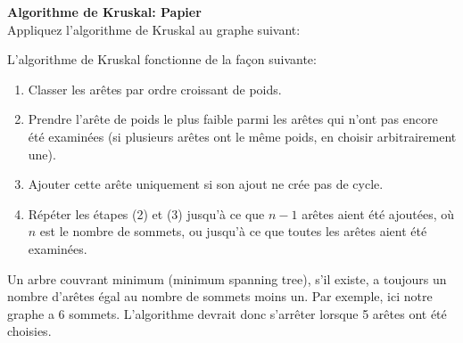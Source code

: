 \begin{Exercice}[5 minutes] \textbf{Algorithme de Kruskal\!: Papier}\\
    Appliquez l'algorithme de Kruskal au graphe suivant\!:\\
    \begin{center}
\end{center}
    \begin{conseil}
        L'algorithme de Kruskal fonctionne de la façon suivante\!:
        \begin{enumerate}
            \item Classer les arêtes par ordre croissant de poids.
            \item Prendre l'arête de poids le plus faible parmi les
            arêtes qui n'ont pas encore été examinées (si plusieurs
            arêtes ont le même poids, en choisir arbitrairement une).
            \item Ajouter cette arête uniquement si son ajout ne crée
            pas de cycle.
            \item Répéter les étapes (2) et (3) jusqu'à ce que
            $n-1$ arêtes aient été ajoutées, où $n$ est le nombre
            de sommets, ou jusqu'à ce que toutes les arêtes aient
            été examinées.
        \end{enumerate}
        Un arbre couvrant minimum (minimum spanning tree), s'il existe, a toujours un nombre d'arêtes égal au nombre de sommets moins un. Par exemple, ici notre graphe a 6 sommets. L'algorithme devrait donc s'arrêter lorsque 5 arêtes ont été choisies.

\end{conseil}
\end{Exercice}
